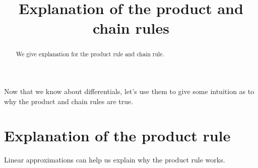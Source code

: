 \documentclass{ximera}
\title[Dig-In:]{Explanation of the product and chain rules}
\begin{document}
\begin{abstract}
  We give explanation for the product rule and chain rule.
\end{abstract}
\maketitle


Now that we know about differentials, let's use them to give some
intuition as to why the product and chain rules are true.


\section{Explanation of the product rule}

Linear approximations can help us explain why the product rule works.
\end{document}

